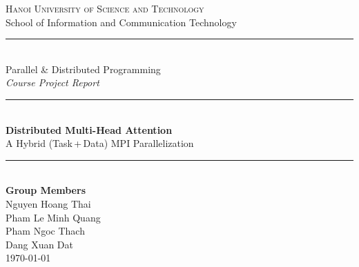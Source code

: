 \documentclass[11pt,a4paper]{article}
\begin{document}
\begin{titlepage}
\centering
\vspace*{1.2cm}
{\large\scshape Hanoi University of Science and Technology}\\[0.25cm]
{\large School of Information and Communication Technology}\\[0.25cm]
\rule{0.5\linewidth}{0.4pt}\\[2.6cm]

{\large Parallel \& Distributed Programming}\\[0.35cm]
{\large\itshape Course Project Report}\\[2.4cm]

{\color{kw}\rule{\linewidth}{1.2pt}}\\[0.55cm]
{\Huge\bfseries Distributed Multi-Head Attention}\\[0.5cm]
{\Large A Hybrid (Task\,+\,Data) MPI Parallelization}\\[0.45cm]
{\color{kw}\rule{\linewidth}{1.2pt}}\\[2.4cm]

{\large\bfseries Group Members}\\[0.55cm]
{\large Nguyen Hoang Thai}\\[0.18cm]
{\large Pham Le Minh Quang}\\[0.18cm]
{\large Pham Ngoc Thach}\\[0.18cm]
{\large Dang Xuan Dat}\\

\vfill
{\large \today}
\end{titlepage}
\end{document}
